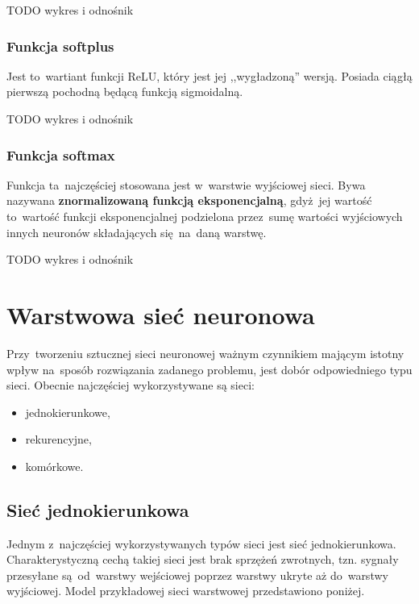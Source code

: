 TODO wykres i odnośnik

\subsubsection{Funkcja softplus}
Jest to~wartiant funkcji ReLU, który jest jej ,,wygładzoną'' wersją. Posiada ciągłą pierwszą pochodną będącą funkcją
sigmoidalną.

TODO wykres i odnośnik

\subsubsection{Funkcja softmax}
Funkcja ta~najczęściej stosowana jest w~warstwie wyjściowej sieci. Bywa nazywana \textbf{znormalizowaną funkcją
eksponencjalną}, gdyż~jej wartość to~wartość funkcji eksponencjalnej podzielona przez~sumę wartości wyjściowych innych
neuronów składających się~na~daną warstwę.

TODO wykres i odnośnik

\section{Warstwowa sieć neuronowa}
Przy~tworzeniu sztucznej sieci neuronowej ważnym czynnikiem mającym istotny wpływ na~sposób rozwiązania
zadanego problemu, jest dobór odpowiedniego typu sieci. Obecnie najczęściej wykorzystywane są sieci:
\begin{itemize}
  \item jednokierunkowe,
  \item rekurencyjne,
  \item komórkowe.
\end{itemize}

\subsection{Sieć jednokierunkowa}
Jednym z~najczęściej wykorzystywanych typów sieci jest sieć jednokierunkowa. Charakterystyczną cechą takiej
sieci jest brak sprzężeń zwrotnych, tzn. sygnały przesyłane są~od~warstwy wejściowej poprzez warstwy ukryte
aż do~warstwy wyjściowej. Model przykładowej sieci warstwowej przedstawiono poniżej.

